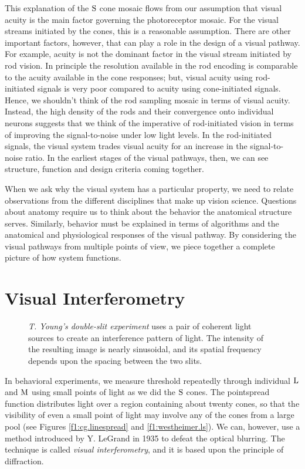 This explanation of the $\mbox{S}$ cone mosaic flows from our
assumption that visual acuity is the main factor governing
the photoreceptor mosaic.
For the visual streams initiated by the cones, this is a 
reasonable assumption.
There are other important factors, however, that can play
a role in the design of a visual pathway.
For example, acuity is not the dominant factor
in the visual stream initiated by rod vision.
In principle the resolution available in the rod encoding is
comparable to the acuity available in the cone responses;
but, visual acuity using rod-initiated signals
is very poor compared to acuity using cone-initiated signals.
Hence, we shouldn't think of the rod sampling mosaic 
in terms of visual acuity.
Instead, the high density of the rods
and their convergence onto individual neurons
suggests that we think
of the imperative of rod-initiated vision
in terms of improving the signal-to-noise 
under low light levels.
In the rod-initiated signals,
the visual system trades visual acuity
for an increase in the signal-to-noise ratio.
In the earliest stages of the visual pathways, then,
we can see structure, function and design criteria
coming together.

When we ask why the visual system has a particular property,
we need to relate observations from the
different disciplines that make up vision science.
Questions about anatomy
require us to think about the behavior the 
anatomical structure serves.
Similarly, behavior must be explained in terms of
algorithms and the anatomical and physiological
responses of the visual pathway.
By considering the visual pathways from multiple points
of view, we piece together
a complete picture of how system functions.

\section{Visual Interferometry}

\begin{figure}
\centerline{
}
\caption[Interference and Double Slits]{
{\em T. Young's double-slit experiment}
uses a pair of coherent light sources
to create an interference pattern of light.
The intensity of the resulting image is nearly sinusoidal, 
and its spatial frequency depends
upon the spacing between the two slits.
}
\label{f2:Young}
\end{figure}
In behavioral experiments,
we measure threshold repeatedly through individual $\mbox{L}$ and $\mbox{M}$
using small points of light as we did the $\mbox{S}$ cones.
The pointspread function distributes
light over a region containing about twenty cones, so that
the visibility of even a small point of light may involve
any of the cones from a large pool
(see Figures \ref{f1:cg.linespread} and \ref{f1:westheimer.ls}).
We can, however, use a method
introduced by Y. LeGrand in 1935
to defeat the optical blurring.
The technique is called {\em visual interferometry},
and it is based upon the principle of diffraction.


